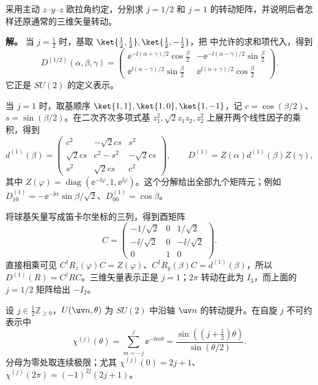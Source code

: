 \begin{example}[{$j=\tfrac12$ 与 $j=1$}]
采用主动 $z$--$y$--$z$ 欧拉角约定，分别求 $j=1/2$ 和 $j=1$ 的转动矩阵，并说明后者怎样还原通常的三维矢量转动。

\textbf{解。} 当 $j=\tfrac12$ 时，基取 $\ket{\frac12,\frac12},\ket{\frac12,-\frac12}$，把  中允许的求和项代入，得到
\[
D^{(1/2)}(\alpha,\beta,\gamma)=
\begin{pmatrix}
\ee^{-\ii(\alpha+\gamma)/2}\cos\frac\beta2
&-\ee^{-\ii(\alpha-\gamma)/2}\sin\frac\beta2\\
\ee^{\ii(\alpha-\gamma)/2}\sin\frac\beta2
&\ee^{\ii(\alpha+\gamma)/2}\cos\frac\beta2
\end{pmatrix}.
\]
它正是 $SU(2)$ 的定义表示。

当 $j=1$ 时，取基顺序 $\ket{1,1},\ket{1,0},\ket{1,-1}$，记 $c=\cos(\beta/2)$、$s=\sin(\beta/2)$。在二次齐次多项式基 $z_1^2,\sqrt2z_1z_2,z_2^2$ 上展开两个线性因子的乘积，得到
\[
d^{(1)}(\beta)=\begin{pmatrix}
c^2&-\sqrt2cs&s^2\\
\sqrt2cs&c^2-s^2&-\sqrt2cs\\
s^2&\sqrt2cs&c^2
\end{pmatrix},\qquad
D^{(1)}=Z(\alpha)d^{(1)}(\beta)Z(\gamma),
\]
其中 $Z(\varphi)=\operatorname{diag}(\ee^{-\ii\varphi},1,\ee^{\ii\varphi})$。这个分解给出全部九个矩阵元；例如 $D^{(1)}_{10}=-\ee^{-\ii\alpha}\sin\beta/\sqrt2$、$D^{(1)}_{00}=\cos\beta$。

将球基矢量写成笛卡尔坐标的三列，得到酉矩阵
\[
C=\begin{pmatrix}
-1/\sqrt2&0&1/\sqrt2\\
-\ii/\sqrt2&0&-\ii/\sqrt2\\
0&1&0
\end{pmatrix}.
\]
直接相乘可见 $C^\dagger R_z(\varphi)C=Z(\varphi)$、$C^\dagger R_y(\beta)C=d^{(1)}(\beta)$，所以 $D^{(1)}(R)=C^\dagger RC$。三维矢量表示正是 $j=1$；$2\pi$ 转动在此为 $I_3$，而上面的 $j=1/2$ 矩阵给出 $-I_2$。
\end{example}

\begin{proposition}[$SU(2)$ 自旋表示的转动特征标]
设 $j\in\tfrac12\mathbb Z_{\ge0}$，$U(\uv n,\theta)$ 为 $SU(2)$ 中沿轴 $\uv n$ 的转动提升。在自旋 $j$ 不可约表示中
\[
\chi^{(j)}(\theta)=\sum_{m=-j}^j\ee^{-\ii m\theta}=\frac{\sin((j+\tfrac12)\theta)}{\sin(\theta/2)}.
\]
分母为零处取连续极限；尤其 $\chi^{(j)}(0)=2j+1$、$\chi^{(j)}(2\pi)=(-1)^{2j}(2j+1)$。
\end{proposition}

